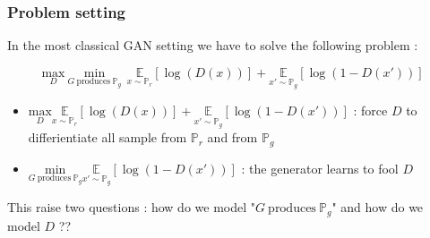 \documentclass[french,9pt]{beamer}
\begin{document}

\begin{frame}
\frametitle{Problem setting}

In the most classical GAN setting we have to solve the following problem :

\begin{equation}
\label{ganoriginalproblem}
\underset{D}{\text{max}} \ \underset{G \ \text{produces} \  \mathbb{P}_{g}}{\text{min}} \  \ \underset{x \sim \mathbb{P}_{r}}{\mathbb{E}}[\log(D(x))]+ \underset{x' \sim \mathbb{P}_{g}}{\mathbb{E}}[\log(1-D(x'))]
\end{equation}

\begin{itemize}
\pause 
\item $\underset{D}{\text{max}} \underset{x \sim \mathbb{P}_{r}}{\mathbb{E}}[\log(D(x))]+ \underset{x' \sim \mathbb{P}_{g}}{\mathbb{E}}[\log(1-D(x'))]$ : force $D$ to differientiate all sample from $\mathbb{P}_{r}$ and from $ \mathbb{P}_{g}$
\pause
\item $\underset{G \ \text{produces} \  \mathbb{P}_{g}}{\text{min}}  \underset{x' \sim \mathbb{P}_{g}}{\mathbb{E}}[\log(1-D(x'))]$ :  the generator learns to fool $D$
\end{itemize}

\pause

This raise two questions : how do we model "$G \ \text{produces} \  \mathbb{P}_{g}$" and how do we model $D$ ??


\end{frame}
\end{document}
